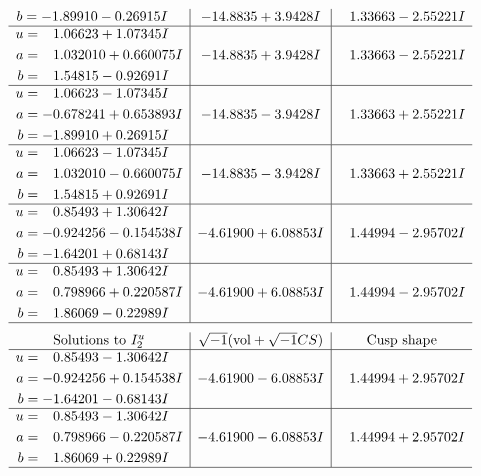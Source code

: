 \documentclass[1p]{elsarticle_modified}
\theoremstyle{definition}
\newcommand{\I}{\sqrt{-1}}
\begin{document}
$$\begin{array}{c|c|c}
\begin{aligned}
b &= -1.89910 - 0.26915 I\end{aligned}
 & -14.8835 + 3.9428 I & \phantom{-}1.33663 - 2.55221 I \\ \hline\begin{aligned}
u &= \phantom{-}1.06623 + 1.07345 I \\
a &= \phantom{-}1.032010 + 0.660075 I \\
b &= \phantom{-}1.54815 - 0.92691 I\end{aligned}
 & -14.8835 + 3.9428 I & \phantom{-}1.33663 - 2.55221 I \\ \hline\begin{aligned}
u &= \phantom{-}1.06623 - 1.07345 I \\
a &= -0.678241 + 0.653893 I \\
b &= -1.89910 + 0.26915 I\end{aligned}
 & -14.8835 - 3.9428 I & \phantom{-}1.33663 + 2.55221 I \\ \hline\begin{aligned}
u &= \phantom{-}1.06623 - 1.07345 I \\
a &= \phantom{-}1.032010 - 0.660075 I \\
b &= \phantom{-}1.54815 + 0.92691 I\end{aligned}
 & -14.8835 - 3.9428 I & \phantom{-}1.33663 + 2.55221 I \\ \hline\begin{aligned}
u &= \phantom{-}0.85493 + 1.30642 I \\
a &= -0.924256 - 0.154538 I \\
b &= -1.64201 + 0.68143 I\end{aligned}
 & -4.61900 + 6.08853 I & \phantom{-}1.44994 - 2.95702 I \\ \hline\begin{aligned}
u &= \phantom{-}0.85493 + 1.30642 I \\
a &= \phantom{-}0.798966 + 0.220587 I \\
b &= \phantom{-}1.86069 - 0.22989 I\end{aligned}
 & -4.61900 + 6.08853 I & \phantom{-}1.44994 - 2.95702 I\\
 \hline 
 \end{array}$$\newpage$$\begin{array}{c|c|c}  
\text{Solutions to }I^u_{2}& \I (\text{vol} + \sqrt{-1}CS) & \text{Cusp shape}\\
 \hline 
\begin{aligned}
u &= \phantom{-}0.85493 - 1.30642 I \\
a &= -0.924256 + 0.154538 I \\
b &= -1.64201 - 0.68143 I\end{aligned}
 & -4.61900 - 6.08853 I & \phantom{-}1.44994 + 2.95702 I \\ \hline\begin{aligned}
u &= \phantom{-}0.85493 - 1.30642 I \\
a &= \phantom{-}0.798966 - 0.220587 I \\
b &= \phantom{-}1.86069 + 0.22989 I\end{aligned}
 & -4.61900 - 6.08853 I & \phantom{-}1.44994 + 2.95702 I\\
 \hline 
 \end{array}$$\newpage\newpage\renewcommand{\arraystretch}{1}
\end{document}
